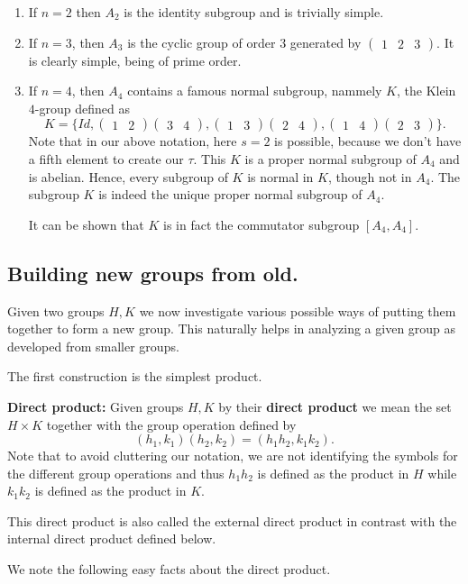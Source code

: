 \documentclass[12pt]{article}
\newcommand{\matr}[2]{\left( \begin{array}{*{#1}{r}}#2\end{array}\right)}
\begin{document}
\begin{enumerate}
\item If $n=2$ then $A_2$ is the identity subgroup and is trivially
simple.
\item If $n=3$, then $A_3$ is the cyclic group of order $3$ generated by
$\matr{3}{1 & 2 & 3}$. It is clearly simple, being of prime order.
\item If $n=4$, then $A_4$ contains a famous normal subgroup, nammely
$K$, the Klein $4$-group defined as
$$K = \{ Id,\matr{2}{1 & 2}\matr{2}{3 &4} ,
\matr{2}{1 & 3}\matr{2}{2 & 4},
\matr{2}{1 & 4}\matr{2}{2 & 3}\}.$$
Note that in our above notation, here $s=2$ is possible, because we
don't have a fifth element to create our $\tau$. This $K$ is a proper
normal subgroup of $A_4$ and is abelian. Hence, every subgroup of $K$ is
normal in $K$, though not in $A_4$. The subgroup $K$ is indeed the
unique proper normal subgroup of $A_4$.

It can be shown that $K$ is in fact the commutator subgroup $[A_4,A_4]$.

\end{enumerate}

\subsection{Building new groups from old.}
Given two groups $H,K$ we now investigate various possible ways of
putting them together to form a new group. This naturally helps in
analyzing a given group as developed from smaller groups.

The first construction is the simplest product.

{\bf Direct product:}
Given groups $H,K$ by their {\bf direct product} we mean the set
$H\times K$ together with the group operation defined by 
$$(h_1,k_1)(h_2,k_2)=(h_1h_2,k_1k_2).$$
Note that to avoid cluttering our notation, we are not identifying the
symbols for the different group operations and thus $h_1h_2$ is defined
as the product in $H$ while $k_1k_2$ is defined as the product in $K$.

This direct product is also called the external direct product in
contrast with the internal direct product defined below.

We note the following easy facts about the direct product.
\end{document}
